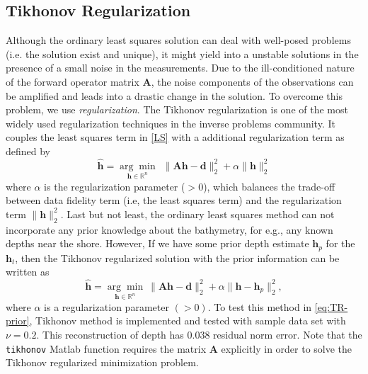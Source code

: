 \subsection{ Tikhonov Regularization}\label{TikRegMethod}

Although the ordinary least squares solution can deal with well-posed problems (i.e. the solution exist and unique), it might yield into a unstable solutions in the presence of a small noise in the measurements. Due to the ill-conditioned nature of the forward operator matrix $\mathbf{A}$, the noise components of the observations can be amplified and leads into a drastic change in the solution. To overcome this problem, we use \textit{regularization}. The Tikhonov regularization is one of the most widely used regularization techniques in the inverse problems community. It couples the least squares term in \eqref{LS} with a additional regularization term as defined by 
\begin{equation}\label{eq:TR}
\mathbf{\hat{h}} = \underset{\mathbf{h} \in \mathbb{R}^n}{\arg \min} \ \ \|  \mathbf{A}\mathbf{h} -  \mathbf{d} \|_2^2  +  \alpha \| \mathbf{h}\|_2^2
\end{equation}
where $\alpha$ is the regularization parameter ($>0$), which balances the trade-off between data fidelity term (i.e, the least squares term) and the regularization term $\| \mathbf{h}\|_2^2$. %
Last but not least, the ordinary least squares method can not incorporate any prior knowledge about the bathymetry, for e.g., any known depths near the shore. However, If we have  some prior depth estimate $\mathbf{h}_p$ for the $\mathbf{h}_t$, then the Tikhonov regularized solution with the prior information can be written as
\begin{equation}\label{eq:TR-prior}
\mathbf{\hat{h}} = \underset{\mathbf{h} \in \mathbb{R}^n}{\arg \min} \  \|  \mathbf{A}\mathbf{h} -  \mathbf{d} \|_2^2  +  \alpha \| \mathbf{h} -  \mathbf{h}_p\|_2^2,
\end{equation}
where $\alpha$ is a regularization parameter $(>0)$. To test this method in \eqref{eq:TR-prior}, Tikhonov method is implemented and tested with sample data set with $\nu = 0.2$. This reconstruction of depth has 0.038 residual norm error. Note that the \verb|tikhonov| Matlab function requires the matrix $\mathbf{A}$ explicitly in order to solve the Tikhonov regularized minimization problem. 

